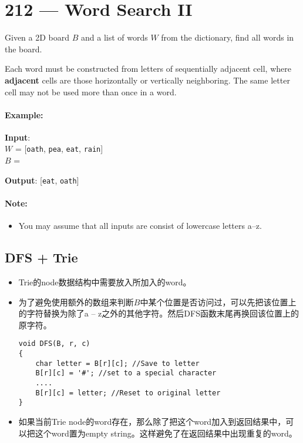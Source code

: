 \section{212 --- Word Search II}
Given a 2D board $B$ and a list of words $W$ from the dictionary, find all words in the board.
\par
Each word must be constructed from letters of sequentially adjacent cell, where \textbf{adjacent} cells are those horizontally or vertically neighboring. The same letter cell may not be used more than once in a word.
\paragraph{Example:}
\begin{flushleft}
\textbf{Input}:
\\
$W$ = [\texttt{oath}, \texttt{pea}, \texttt{eat}, \texttt{rain}]
\\
$B$ =
\begin{figure}[H]
\end{figure} 
\textbf{Output}: [\texttt{eat}, \texttt{oath}]
\end{flushleft}
\paragraph{Note:}
\begin{itemize}
\item You may assume that all inputs are consist of lowercase letters a--z.
\end{itemize}
\subsection{DFS + Trie}
\begin{itemize}
\item Trie的node数据结构中需要放入所加入的word。
\item 为了避免使用额外的数组来判断$B$中某个位置是否访问过，可以先把该位置上的字符替换为除了a -- z之外的其他字符。然后DFS函数末尾再换回该位置上的原字符。
\begin{lstlisting}[style=customc]
void DFS(B, r, c)
{
 	char letter = B[r][c]; //Save to letter
 	B[r][c] = '#'; //set to a special character
 	....
 	B[r][c] = letter; //Reset to original letter
}
\end{lstlisting}
\item 如果当前Trie node的word存在，那么除了把这个word加入到返回结果中，可以把这个word置为empty string。这样避免了在返回结果中出现重复的word。
\end{itemize}

